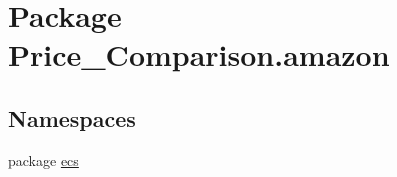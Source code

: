 \hypertarget{namespace_price___comparison_1_1amazon}{\section{Package Price\-\_\-\-Comparison.\-amazon}
\label{namespace_price___comparison_1_1amazon}
}
\subsection*{Namespaces}
\begin{DoxyCompactItemize}
\item 
package \hyperlink{namespace_price___comparison_1_1amazon_1_1ecs}{ecs}
\end{DoxyCompactItemize}
